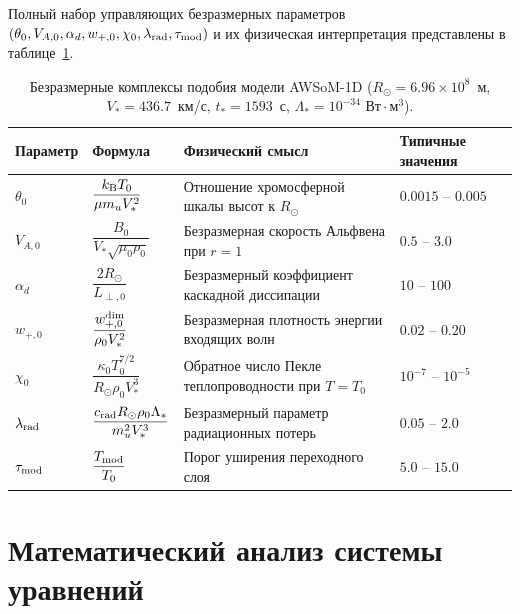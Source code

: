 \documentclass[11pt,a4paper]{article}
\begin{document}
Полный набор управляющих безразмерных параметров $(\theta_0, V_{A,0}, \alpha_d, w_{+,0}, \chi_0, \lambda_{\rm rad}, \tau_{\rm mod})$ и их физическая интерпретация представлены в таблице~\ref{tab:params}.

\begin{table}[ht!]
\centering
\small
\setlength{\tabcolsep}{4pt}
\caption{Безразмерные комплексы подобия модели AWSoM-1D ($R_\odot = 6.96\times 10^8$~м, $V_* = 436.7$~км/с, $t_* = 1593$~с, $\Lambda_* = 10^{-34}\text{ Вт}\cdot\text{м}^3$).}
\vspace{2mm}
\begin{tabular}{@{}llll@{}}
\toprule
\textbf{Параметр} & \textbf{Формула} & \textbf{Физический смысл} & \textbf{Типичные значения} \\
\midrule
$\theta_0$ & $\dfrac{k_{\rm B}T_0}{\mu m_u V_*^2}$ & Отношение хромосферной шкалы высот к $R_\odot$ & $0.0015 \text{ -- } 0.005$ \\[7pt]
$V_{A,0}$ & $\dfrac{B_0}{V_*\sqrt{\mu_0\rho_0}}$ & Безразмерная скорость Альфвена при $r=1$ & $0.5 \text{ -- } 3.0$ \\[7pt]
$\alpha_d$ & $\dfrac{2 R_\odot}{L_{\perp,0}}$ & Безразмерный коэффициент каскадной диссипации & $10 \text{ -- } 100$ \\[7pt]
$w_{+,0}$ & $\dfrac{w_{+,0}^{\rm dim}}{\rho_0 V_*^2}$ & Безразмерная плотность энергии входящих волн & $0.02 \text{ -- } 0.20$ \\[7pt]
$\chi_0$ & $\dfrac{\kappa_0 T_0^{7/2}}{R_\odot\rho_0 V_*^3}$ & Обратное число Пекле теплопроводности при $T=T_0$ & $10^{-7} \text{ -- } 10^{-5}$ \\[7pt]
$\lambda_{\rm rad}$ & $\dfrac{c_{\rm rad} R_\odot \rho_0 \Lambda_*}{m_u^2 V_*^3}$ & Безразмерный параметр радиационных потерь & $0.05 \text{ -- } 2.0$ \\[7pt]
$\tau_{\rm mod}$ & $\dfrac{T_{\rm mod}}{T_0}$ & Порог уширения переходного слоя & $5.0 \text{ -- } 15.0$ \\
\bottomrule
\end{tabular}
\label{tab:params}
\end{table}

\section{Математический анализ системы уравнений}
\end{document}
